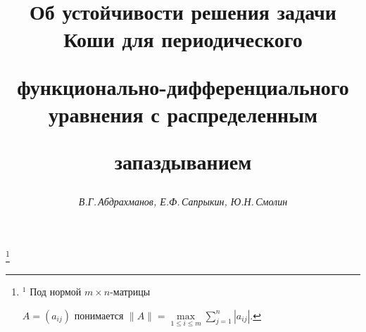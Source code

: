 






\newcommand{\eqdef}{\overset{\mathrm{def}}{=}{}}


\newcommand{\tts}[1]{}







\setcounter{page}{3}















\author{\it В.Г.\,Абдрахманов, Е.Ф.\,Сапрыкин, Ю.Н.\,Смолин}




\title{Об устойчивости решения задачи Коши для периодического


функционально-дифференциального уравнения с распределенным


запаздыванием}


\thanks{$^1$ Под нормой $m\times n$-матрицы


$A=(a_{ij})$ понимается $\|A\|=\max\limits_{1\le i\le m}


\sum\limits_{j=1}^n|a_{ij}|$.}





\date{}




\pagestyle{plain} %





